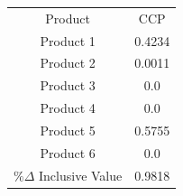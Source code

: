 \begin{tabular}{cc}
Product & CCP \\
Product 1 & 0.4234 \\
Product 2 & 0.0011 \\
Product 3 & 0.0 \\
Product 4 & 0.0 \\
Product 5 & 0.5755 \\
Product 6 & 0.0 \\
$\%\Delta$ Inclusive Value & 0.9818 \\
\end{tabular}